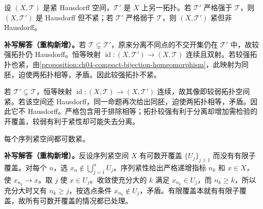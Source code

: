 \documentclass[../../main.tex]{subfiles}%
\begin{document}
\begin{exercise}\label{exercise:ch04-compact-hausdorff-topologies}
设 $(X,\mathcal T)$ 是紧 Hausdorff 空间，$\mathcal T'$ 是 $X$ 上另一拓扑。若 $\mathcal T'$ 严格强于 $\mathcal T$，则 $(X,\mathcal T')$ 是 Hausdorff 但不紧；若 $\mathcal T'$ 严格弱于 $\mathcal T$，则 $(X,\mathcal T')$ 紧但非 Hausdorff。
\end{exercise}
\begin{solution}
\textbf{补写解答（重构新增）。}若 $\mathcal T\subsetneq\mathcal T'$，原来分离不同点的不交开集仍在 $\mathcal T'$ 中，故较强拓扑仍 Hausdorff。恒等映射 $\operatorname{id}:(X,\mathcal T')\to(X,\mathcal T)$ 连续且双射。若较强拓扑也紧，由\cref{proposition:ch04-compact-bijection-homeomorphism}，此映射为同胚，迫使两拓扑相等，矛盾。因此较强拓扑不紧。

若 $\mathcal T'\subsetneq\mathcal T$，恒等映射 $\operatorname{id}:(X,\mathcal T)\to(X,\mathcal T')$ 连续，故其像即较弱拓扑空间紧。若该空间还 Hausdorff，同一命题再次给出同胚，迫使两拓扑相等，矛盾。因此它不 Hausdorff。严格包含用于排除相等；拓扑较强有利于分离却增加需检验的开覆盖，较弱有利于紧性却可能失去分离。
\end{solution}
\begin{exercise}\label{exercise:ch04-sequential-countably-compact}
每个序列紧空间都可数紧。
\end{exercise}
\begin{solution}
\textbf{补写解答（重构新增）。}反设序列紧空间 $X$ 有可数开覆盖 $\{U_j\}_{j\ge1}$ 而没有有限子覆盖。对每个 $n$，选 $x_n\notin\bigcup_{j=1}^nU_j$。序列紧性给出严格递增指标 $n_k$ 和 $x\in X$，使 $x_{n_k}\to x$。取 $j$ 使 $x\in U_j$。收敛使充分大的 $k$ 满足 $x_{n_k}\in U_j$，而 $n_k\ge k$，所以充分大时又有 $n_k\ge j$，按选点条件 $x_{n_k}\notin U_j$，矛盾。有限覆盖本就有有限子覆盖，故所有可数开覆盖的情况都已处理。
\end{solution}
\end{document}
